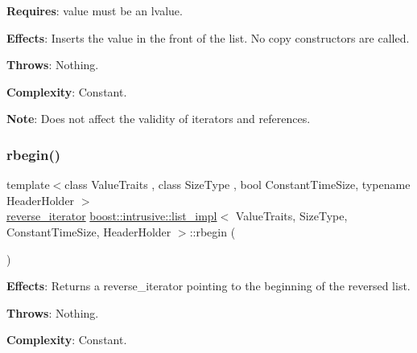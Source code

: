{\bfseries Requires}\+: value must be an lvalue.

{\bfseries Effects}\+: Inserts the value in the front of the list. No copy constructors are called.

{\bfseries Throws}\+: Nothing.

{\bfseries Complexity}\+: Constant.

{\bfseries Note}\+: Does not affect the validity of iterators and references. \mbox{\label{classboost_1_1intrusive_1_1list__impl_a0073263f314407b1e94f63084e05b77e}} 
\subsubsection{\texorpdfstring{rbegin()}{rbegin()}\hspace{0.1cm}{\footnotesize\ttfamily [1/2]}}
{\footnotesize\ttfamily template$<$class Value\+Traits , class Size\+Type , bool Constant\+Time\+Size, typename Header\+Holder $>$ \\
\hyperlink{classboost_1_1intrusive_1_1list__impl_aed95b235a2056faa7d2f8cbd58dcfeb7}{reverse\+\_\+iterator} \hyperlink{classboost_1_1intrusive_1_1list__impl}{boost\+::intrusive\+::list\+\_\+impl}$<$ Value\+Traits, Size\+Type, Constant\+Time\+Size, Header\+Holder $>$\+::rbegin (\begin{DoxyParamCaption}{ }\end{DoxyParamCaption})\hspace{0.3cm}{\ttfamily [inline]}}

{\bfseries Effects}\+: Returns a reverse\+\_\+iterator pointing to the beginning of the reversed list.

{\bfseries Throws}\+: Nothing.

{\bfseries Complexity}\+: Constant. \mbox{\label{classboost_1_1intrusive_1_1list__impl_a7a6e55dedd23bd303a71d764395420a8}} 
